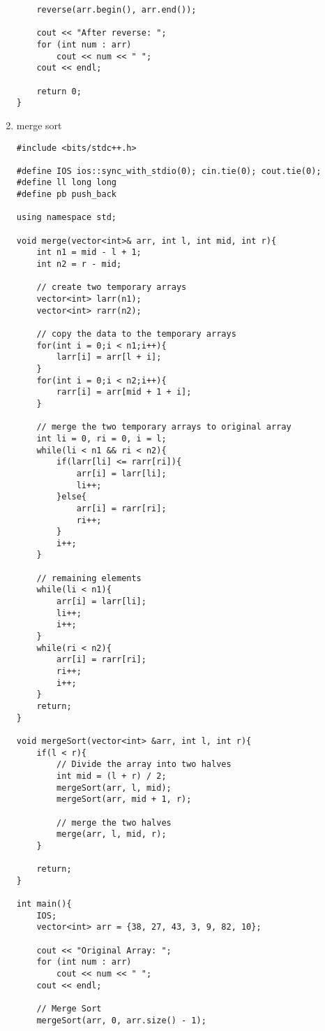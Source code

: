 \documentclass[12pt, a4paper]{article}
\begin{document}
\begin{enumerate}
\begin{lstlisting}
    reverse(arr.begin(), arr.end());

    cout << "After reverse: ";
    for (int num : arr)
        cout << num << " ";
    cout << endl;

    return 0;
}
\end{lstlisting}

\item merge sort

\begin{lstlisting}
#include <bits/stdc++.h>

#define IOS ios::sync_with_stdio(0); cin.tie(0); cout.tie(0);
#define ll long long
#define pb push_back

using namespace std;

void merge(vector<int>& arr, int l, int mid, int r){
    int n1 = mid - l + 1;
    int n2 = r - mid;

    // create two temporary arrays
    vector<int> larr(n1);
    vector<int> rarr(n2);

    // copy the data to the temporary arrays
    for(int i = 0;i < n1;i++){
        larr[i] = arr[l + i];
    }
    for(int i = 0;i < n2;i++){
        rarr[i] = arr[mid + 1 + i];
    }

    // merge the two temporary arrays to original array
    int li = 0, ri = 0, i = l;
    while(li < n1 && ri < n2){
        if(larr[li] <= rarr[ri]){
            arr[i] = larr[li];
            li++;
        }else{
            arr[i] = rarr[ri];
            ri++;
        }
        i++;
    }

    // remaining elements
    while(li < n1){
        arr[i] = larr[li];
        li++;
        i++;
    }
    while(ri < n2){
        arr[i] = rarr[ri];
        ri++;
        i++;
    }
    return;
}

void mergeSort(vector<int> &arr, int l, int r){
    if(l < r){
        // Divide the array into two halves
        int mid = (l + r) / 2;
        mergeSort(arr, l, mid);
        mergeSort(arr, mid + 1, r);

        // merge the two halves
        merge(arr, l, mid, r);
    }

    return;
}

int main(){
    IOS;
    vector<int> arr = {38, 27, 43, 3, 9, 82, 10};

    cout << "Original Array: ";
    for (int num : arr)
        cout << num << " ";
    cout << endl;

    // Merge Sort
    mergeSort(arr, 0, arr.size() - 1);


\end{lstlisting}
\end{enumerate}
\end{document}
